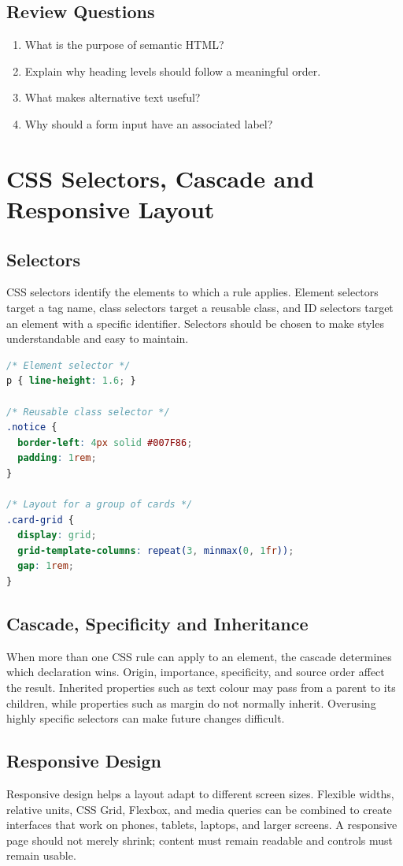 \documentclass[11pt,openany,oneside]{book}
\begin{document}
\section*{Review Questions}
\begin{enumerate}
\item What is the purpose of semantic HTML?
\item Explain why heading levels should follow a meaningful order.
\item What makes alternative text useful?
\item Why should a form input have an associated label?
\end{enumerate}

\chapter{CSS Selectors, Cascade and Responsive Layout}
\section{Selectors}
CSS selectors identify the elements to which a rule applies. Element selectors target a tag name, class selectors target a reusable class, and ID selectors target an element with a specific identifier. Selectors should be chosen to make styles understandable and easy to maintain.

\begin{lstlisting}[style=webcode,language=CSS]
/* Element selector */
p { line-height: 1.6; }

/* Reusable class selector */
.notice {
  border-left: 4px solid #007F86;
  padding: 1rem;
}

/* Layout for a group of cards */
.card-grid {
  display: grid;
  grid-template-columns: repeat(3, minmax(0, 1fr));
  gap: 1rem;
}
\end{lstlisting}

\section{Cascade, Specificity and Inheritance}
When more than one CSS rule can apply to an element, the cascade determines which declaration wins. Origin, importance, specificity, and source order affect the result. Inherited properties such as text colour may pass from a parent to its children, while properties such as margin do not normally inherit. Overusing highly specific selectors can make future changes difficult.

\section{Responsive Design}
Responsive design helps a layout adapt to different screen sizes. Flexible widths, relative units, CSS Grid, Flexbox, and media queries can be combined to create interfaces that work on phones, tablets, laptops, and larger screens. A responsive page should not merely shrink; content must remain readable and controls must remain usable.
\end{document}
